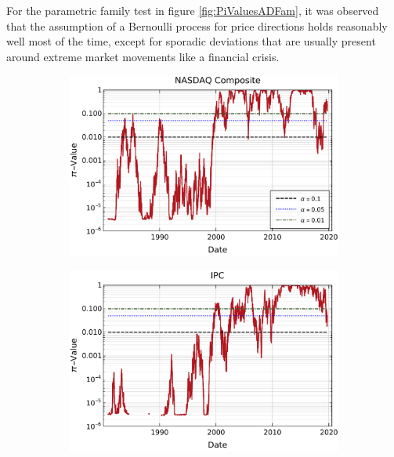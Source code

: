 \documentclass[a4paper]{jpconf}
\begin{document}
For the parametric family test in figure \ref{fig:PiValuesADFam}, it was observed that the assumption of a Bernoulli process for price directions holds reasonably well most of the time, except for sporadic deviations that are usually present around extreme market movements like a financial crisis.

\begin{figure}[h!tb]
	\centering
        \begin{subfigure}[b]{0.45\textwidth}
            \centering
            \includegraphics[width=\textwidth]{img/pvalores_NASDAQ.pdf}
            \caption[]{}    
            \label{fig:nasdaq}
        \end{subfigure}
        \quad
        \begin{subfigure}[b]{0.45\textwidth}  
            \centering 
            \includegraphics[width=\textwidth]{img/pvalores_IPC.pdf}

\end{subfigure}
\end{figure}
\end{document}
